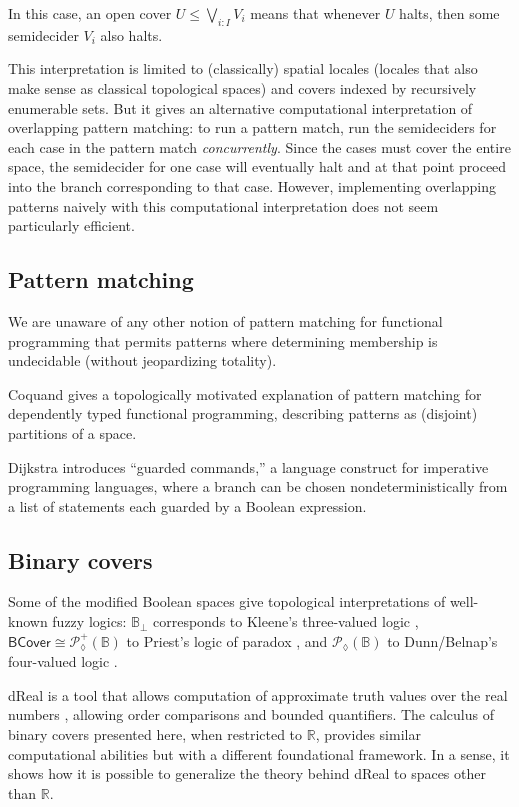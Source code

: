\documentclass[conference]{IEEEtran}
\newcommand{\PLower}{\mathcal{P}_\lozenge}
\newcommand{\R}{\mathbb{R}}
\newcommand{\bool}{\mathbb{B}}
\newcommand{\BCover}{\mathsf{BCover}}
\newcommand{\grammar}[1]{\textcolor{red}{\underline{#1}}}
\renewcommand{\grammar}[1]{#1}
\begin{document}
In this case, an open cover $U \le \bigvee_{i : I} V_i$ means that whenever $U$ halts, then some semidecider $V_i$ also halts.

This interpretation is limited to (classically) spatial locales (locales that also make sense as classical topological spaces) and covers indexed by recursively enumerable sets. But it gives an alternative computational interpretation of overlapping pattern matching: to run a pattern match, run the semideciders for each case in the pattern match \emph{concurrently}. Since the cases must cover the entire space, the semidecider for one case will eventually halt and at that point proceed into the branch corresponding to that case. However, implementing overlapping patterns naively with this computational interpretation does not seem particularly efficient.

\subsection{Pattern matching}

We are unaware of any other notion of pattern matching for functional programming that permits patterns where determining membership is undecidable (without jeopardizing totality).

Coquand \cite{coquand1992} gives a topologically motivated explanation of pattern matching for dependently typed functional programming, describing patterns as (disjoint) partitions of a space.

Dijkstra \cite{dijkstra} introduces ``guarded commands,'' a language construct for imperative programming languages, where a branch can be chosen nondeterministically from a list of statements each guarded by a Boolean expression.

\subsection{Binary covers}

Some of the modified Boolean spaces give topological interpretations of well-known fuzzy logics: $\bool_\bot$ corresponds to Kleene's three-valued logic \cite{kleenemetamathematics}, $\BCover \cong \PLower^+(\bool)$ to Priest's logic of paradox \cite{priest}, and $\PLower(\bool)$ to Dunn/Belnap's four-valued logic \cite{sep-logic-manyvalued}.

dReal is a tool that allows computation of approximate truth values over the real numbers \cite{dReal}, allowing order comparisons and bounded quantifiers. The calculus of binary covers presented here, when restricted to $\R$, provides similar computational abilities but with a different foundational framework. In a sense, \grammar{it} shows how it is possible to generalize the theory behind dReal to spaces other than $\R$.
\end{document}
